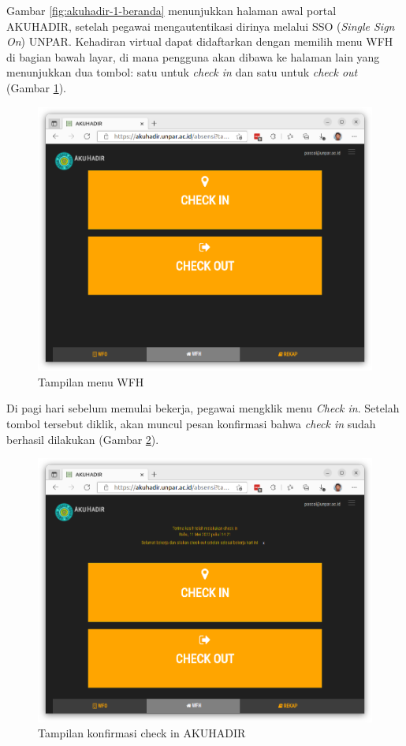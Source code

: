 Gambar \ref{fig:akuhadir-1-beranda} menunjukkan halaman awal portal AKUHADIR, setelah pegawai mengautentikasi dirinya melalui SSO (\textit{Single Sign On}) UNPAR. Kehadiran virtual dapat didaftarkan dengan memilih menu WFH di bagian bawah layar, di mana pengguna akan dibawa ke halaman lain yang menunjukkan dua tombol: satu untuk \textit{check in} dan satu untuk \textit{check out} (Gambar \ref{fig:akuhadir-2-wfh}).

\begin{figure}[H]
	\centering
	\includegraphics[scale=0.25]{Gambar/akuhadir-2-wfh.png}
	\caption{Tampilan menu WFH} 
	\label{fig:akuhadir-2-wfh}
\end{figure}

Di pagi hari sebelum memulai bekerja, pegawai mengklik menu \textit{Check in}. Setelah tombol tersebut diklik, akan muncul pesan konfirmasi bahwa \textit{check in} sudah berhasil dilakukan (Gambar \ref{fig:akuhadir-3-wfh-checkin}).

\begin{figure}[H]
	\centering
	\includegraphics[scale=0.25]{Gambar/akuhadir-3-wfh-checkin.png}
	\caption{Tampilan konfirmasi check in AKUHADIR} 
	\label{fig:akuhadir-3-wfh-checkin}
\end{figure}

